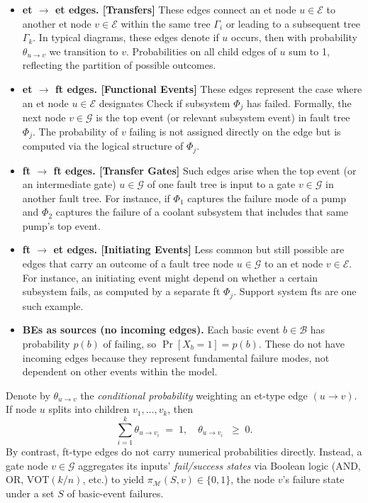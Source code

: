 \begin{itemize}
\item \textbf{\acrshort{et} \(\to\) \acrshort{et} edges. [Transfers]}  These edges connect an \acrshort{et} node \(u\in\mathcal{E}\) to another \acrshort{et} node \(v\in\mathcal{E}\) within the same tree \(\Gamma_i\) or leading to a subsequent tree \(\Gamma_{k}\).  In typical diagrams, these edges denote if \(u\) occurs, then with probability \(\theta_{u\to v}\) we transition to \(v\).  Probabilities on all child edges of \(u\) sum to 1, reflecting the partition of possible outcomes.

\item \textbf{\acrshort{et} \(\to\) \acrshort{ft} edges. [Functional Events]}  These edges represent the case where an \acrshort{et} node \(u\in\mathcal{E}\) designates Check if subsystem \(\Phi_j\) has failed.  Formally, the next node \(v\in\mathcal{G}\) is the top event (or relevant subsystem event) in fault tree \(\Phi_j\).  The probability of \(v\) failing is not assigned directly on the edge but is computed via the logical structure of \(\Phi_j\).  

\item \textbf{\acrshort{ft} \(\to\) \acrshort{ft} edges. [Transfer Gates]}  Such edges arise when the top event (or an intermediate gate) \(u\in\mathcal{G}\) of one fault tree is input to a gate \(v\in\mathcal{G}\) in another fault tree.  For instance, if \(\Phi_{1}\) captures the failure mode of a pump and \(\Phi_{2}\) captures the failure of a coolant subsystem that includes that same pump's top event.  

\item \textbf{\acrshort{ft} \(\to\) \acrshort{et} edges. [Initiating Events]}  Less common but still possible are edges that carry an outcome of a fault tree node \(u\in\mathcal{G}\) to an \acrshort{et} node \(v\in\mathcal{E}\).  For instance, an initiating event might depend on whether a certain subsystem fails, as computed by a separate \acrshort{ft} \(\Phi_j\). Support system \acrshort{ft}s are one such example.

\item \textbf{BEs as sources (no incoming edges).}  Each basic event \(b\in\mathcal{B}\) has probability \(p(b)\) of failing, so \(\Pr[X_b=1]\!=\!p(b)\).  These do not have incoming edges because they represent fundamental failure modes, not dependent on other events within the model.  
\end{itemize}
Denote by \(\theta_{u\to v}\) the \emph{conditional probability} weighting an \acrshort{et}-type edge \((u\!\to\!v)\).  If node \(u\) splits into children \(v_1,\dots,v_k\), then
\[
\sum_{i=1}^k \theta_{u \to v_i} \;=\; 1,
\quad
\theta_{u \to v_i}\;\; \ge\;0.
\]
By contrast, \acrshort{ft}-type edges do not carry numerical probabilities directly.  Instead, a gate node \(v\in \mathcal{G}\) aggregates its inputs' \emph{fail/success states} via Boolean logic (AND, OR, \(\mathrm{VOT}(k/n)\), etc.) to yield \(\pi_{\mathcal{M}}(S,v)\in\{0,1\}\), the node \(v\)'s failure state under a set \(S\) of basic-event failures.

